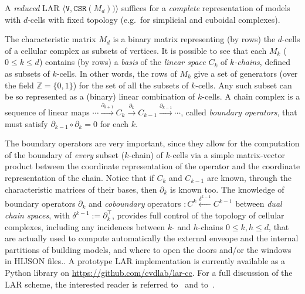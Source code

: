 A \emph{reduced} LAR $\langle \texttt{V}, \texttt{CSR}(M_d)) \rangle$ suffices for a \emph{complete} representation of models with $d$-cells with fixed topology (e.g.~for simplicial and cuboidal complexes).

The characteristic matrix $M_d$ is a binary matrix representing (by rows) the $d$-cells of a cellular complex as subsets of vertices. It is possible to see that each $M_k$ ($0\leq k\leq d$) contains (by rows) a \emph{basis} of the \emph{linear space} $C_k$ of \emph{$k$-chains}, defined as subsets of $k$-cells. In other words, the rows of $M_k$ give a set of generators (over the field $\mathbb{Z} = \{0,1\}$) for the set of all the subsets of $k$-cells. Any such subset can be so represented as a (binary) linear combination of $k$-cells.
A chain complex is a sequence of linear maps $ \cdots \xrightarrow{\partial_{k+1}} C_k \xrightarrow{\partial_k} C_{k-1} \xrightarrow{\partial_{k-1}} \cdots $, called \emph{boundary operators}, that must satisfy $\partial_{k-1} \circ \partial_k=0$ for each $k$.

The boundary operators are very important, since they allow for the computation of the boundary of \emph{every} subset ($k$-chain) of $k$-cells via a simple matrix-vector product between the coordinate representation of the operator and the coordinate representation of the chain. Notice that if $C_k$ and $C_{k-1}$ are known, through the characteristic matrices of their bases, then $\partial_k$ is known too.
The knowledge of boundary operators $\partial_k$ and \emph{coboundary} operators $: C^{k} \xleftarrow{\delta^{k-1}} C^{k-1}$ between \emph{dual chain spaces}, with $\delta^{k-1} := \partial_k^\top$, provides full control of the topology of cellular complexes, including  any incidences between $k$- and $h$-chains $0\leq k,h\leq d$, that are actually used to compute automatically the external enveope and the internal partitions of building models, and where to open the doors and/or the windows in HIJSON files..
A prototype LAR implementation is currently available as a Python library on \href{https://github.com/cvdlab/lar-cc}{https://github.com/cvdlab/lar-cc}. For a full discussion of the LAR scheme, the interested reader is referred to~\cite{Dicarlo:2014:TNL:2543138.2543294} and to~\cite{cadanda:2015}.

